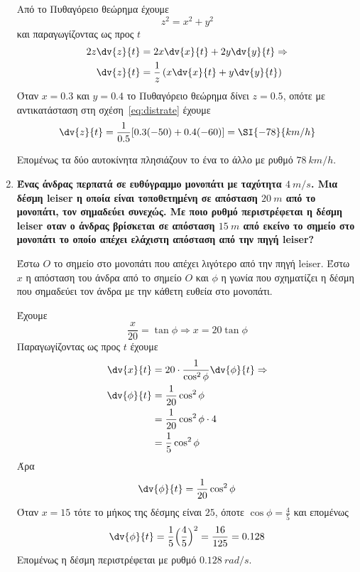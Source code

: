 \begin{enumerate}
\begin{solution}
      Από το Πυθαγόρειο θεώρημα έχουμε
      \[
        z^{2}=x^{2}+y^{2}
      \]
      και παραγωγίζοντας ως προς $t$
      \begin{align} \label{eq:distrate}
        2z\dv{z}{t} &= 2x\dv{x}{t} + 2y\dv{y}{t} \notag \Rightarrow \\
        \dv{z}{t} &= \frac{1}{z}\left(x\dv{x}{t}+y\dv{y}{t}\right)
      \end{align}
      Όταν $x=0.3$ και $y=0.4$ το Πυθαγόρειο θεώρημα δίνει $z=0.5$, οπότε με 
      αντικατάσταση στη σχέση~\eqref{eq:distrate} έχουμε
      \[
        \dv{z}{t}=\frac{1}{0.5}[0.3(-50)+0.4(-60)] = \SI{-78}{km/h}
      \]

      Επομένως τα δύο αυτοκίνητα πλησιάζουν το ένα το άλλο με ρυθμό $\SI{78}{km/h}$.
    \end{solution}

  \item {\bfseries \boldmath Ένας άνδρας περπατά σε ευθύγραμμο μονοπάτι με
      ταχύτητα $\SI{4}{m/s}$. Μια δέσμη leiser η οποία είναι τοποθετημένη σε απόσταση 
      $\SI{20}{m}$ από το μονοπάτι, τον σημαδεύει συνεχώς. Με ποιο ρυθμό περιστρέφεται η 
      δέσμη leiser οταν ο άνδρας βρίσκεται σε απόσταση $\SI{15}{m}$ από εκείνο το σημείο 
    στο μονοπάτι το οποίο απέχει ελάχιστη απόσταση από την πηγή leiser?}
    \begin{solution}
      Έστω $O$ το σημείο στο μονοπάτι που απέχει λιγότερο από την πηγή leiser.
      Έστω $x$ η απόσταση του άνδρα από το σημείο $O$ και $\phi$ η γωνία που σχηματίζει 
      η δέσμη που σημαδεύει τον άνδρα με την κάθετη ευθεία στο μονοπάτι.

      Έχουμε
      \[
        \frac{x}{20}=\tan\phi \Rightarrow x=20\tan\phi
      \]
      Παραγωγίζοντας ως προς $t$ έχουμε
      \begin{align*}
        \dv{x}{t} &= 20\cdot \frac{1}{\cos^{2}\phi}\dv{\phi}{t} \notag \Rightarrow \\
        \dv{\phi}{t}&=\frac{1}{20}\cos^{2}\phi \\
                    &=\frac{1}{20}\cos^{2}\phi\cdot 4 \\
                    &=\frac{1}{5}\cos^{2}\phi
      \end{align*}
      Άρα
      \begin{equation} \label{eq:anglerate}
        \dv{\phi}{t}=\frac{1}{20}\cos^{2}\phi
      \end{equation}
      Όταν $x=15$ τότε το μήκος της δέσμης είναι $25$, όποτε $\cos\phi = \frac{4}{5}$ 
      και επομένως
      \[
        \dv{\phi}{t} = \frac{1}{5}\Bigl(\frac{4}{5}\Bigr)^{2} = \frac{16}{125} = 0.128
      \]
      Επομένως η δέσμη περιστρέφεται με ρυθμό $\SI{0.128}{rad/s}$.
    \end{solution}


\end{enumerate}
